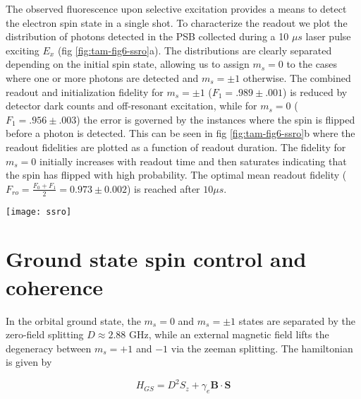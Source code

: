 The observed fluorescence upon selective excitation provides a means to detect the electron spin state in a single shot\cite{Robledo_Nature_2011}. To characterize the readout we plot the distribution of photons detected in the PSB collected during a 10 $\mu s$ laser pulse exciting $E_x$ (fig \ref{fig:tam-fig6-ssro}a). The distributions are clearly separated depending on the initial spin state, allowing us to assign $m_s = 0$ to the cases where one or more photons are detected and $m_s = \pm 1$ otherwise. The combined readout and initialization fidelity for $m_s = \pm 1$ ($F_1 = .989 \pm .001$) is reduced by detector dark counts and off-resonant excitation, while for $m_s = 0$ ($F_1 = .956 \pm .003$) the error is governed by the instances where the spin is flipped before a photon is detected. This can be seen in fig \ref{fig:tam-fig6-ssro}b where the readout fidelities are plotted as a function of readout duration. The fidelity for $m_s = 0$ initially increases with readout time and then saturates indicating that the spin has flipped with high probability. The optimal mean readout fidelity ($F_{ro} = \frac{F_0+F_1}{2} = 0.973 \pm 0.002$) is reached after $10 \mu s$.

\begin{figure*}
	\centering
	\texttt{[image: ssro]}
	\caption{\label{fig:tam-fig6-ssro} \textbf{Single shot readout} (a) Histograms of the number of detected photons in the PSB for initial state $m_s = 0$ (blue) and $m_s=\pm 1$ (red) during a 10 $\mu s$ readout on $E_x$. (b) Fidelities for reading out the electron spin state initially prepared in $m_s = 0$ (blue) and $m_s = \pm 1$ (red) as a function of readout duration. The mean readout fidelity is plotted in grey. The inset is a zoom of the region where the optimal mean readout fidelity is reached.}
\end{figure*}

\section{Ground state spin control and coherence}

In the orbital ground state, the $m_s = 0$ and $m_s = \pm 1$ states are separated by the zero-field splitting $D \approx 2.88$ GHz, while an external magnetic field lifts the degeneracy between $m_s = +1$ and $-1$ via the zeeman splitting. The hamiltonian is given by

\begin{equation}
H_{GS} = D^2 S_z + \gamma_e \mathbf{B} \cdot \mathbf{S}
\end{equation}

